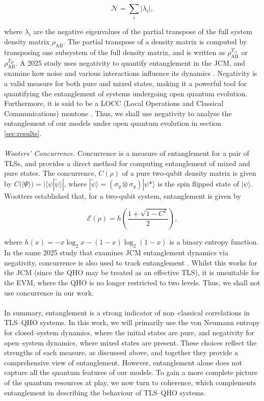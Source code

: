 \documentclass[12pt]{article}
\begin{document}
\begin{equation} \label{vne_eqn}
    \mathcal{N} = \sum_i |\lambda_i|,
\end{equation}

where $\lambda_i$ are the negative eigenvalues of the partial transpose of the full system density matrix $\rho_{\scriptscriptstyle \text{AB}}$. The partial transpose of a density matrix is computed by transposing one subsystem of the full density matrix, and is written as $\rho_{\scriptscriptstyle \text{AB}}^{T_A}$ or $\rho_{\scriptscriptstyle \text{AB}}^{T_B}$. A 2025 study uses negativity to quantify entanglement in the JCM, and examine how noise and various interactions influence its dynamics \cite{Entanglement2025-Negativity}. Negativity is a valid measure for both pure and mixed states, making it a powerful tool for quantifying the entanglement of systems undergoing open quantum evolution. Furthermore, it is said to be a LOCC (Local Operations and Classical Communications) montone \cite{Entanglement2009-Definition}. Thus, we shall use negativity to analyse the entanglement of our models under open quantum evolution in section \ref{sec:results}. \\
\\
\textit{Wooters' Concurrence.} Concurrence is a measure of entanglement for a pair of TLSs, and provides a direct method for computing entanglement of mixed and pure states. The concurrence, $C(\rho)$ of a pure two-qubit density matrix is given by $C(|\Psi\rangle) = |\langle\psi|\tilde{\psi}\rangle|$, where $|\tilde{\psi}\rangle = (\sigma_y\otimes\sigma_y)|\psi*\rangle$ is the spin flipped state of $|\psi\rangle$. Wootters established that, for a two-qubit system, entanglement is given by

\begin{equation}
    \mathcal{E}(\rho) = h\left(\frac{1+\sqrt{1-C^2}}{2}\right),
\end{equation} 

where $h(x) = - x\log_2x - (1 - x)\log_2(1 -x)$ is a binary entropy function. In the same 2025 study that examines JCM entanglement dynamics via negativity, concurrence is also used to track entanglement \cite{Entanglement2025-Negativity}. Whilst this works for the JCM (since the QHO may be treated as an effective TLS), it is unsuitable for the EVM, where the QHO is no longer restricted to two levels. Thus, we shall not use concurrence in our work.\\
\\
In summary, entanglement is a strong indicator of non--classical correlations in TLS--QHO systems. In this work, we will primarily use the von Neumann entropy for closed--system dynamics, where the initial states are pure, and negativity for open--system dynamics, where mixed states are present. These choices reflect the strengths of each measure, as discussed above, and together they provide a comprehensive view of entanglement. However, entanglement alone does not capture all the quantum features of our models. To gain a more complete picture of the quantum resources at play, we now turn to coherence, which complements entanglement in describing the behaviour of TLS--QHO systems.
\end{document}
